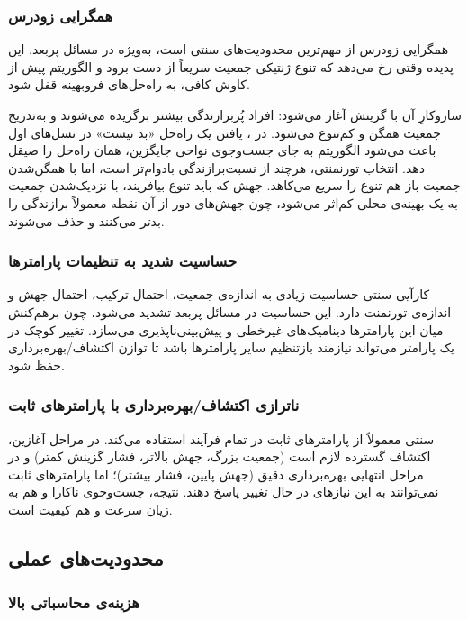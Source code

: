 \subsubsection{همگرايی زودرس}

همگرايی زودرس از مهم‌ترين محدوديت‌های  سنتی است، به‌ويژه در مسائل پربعد. اين پديده وقتی رخ می‌دهد که تنوع ژنتيکی جمعيت سريعاً از دست برود و الگوريتم پيش از کاوش کافی، به راه‌حل‌های فروبهينه قفل شود.

سازوکارِ آن با گزينش آغاز می‌شود: افراد پُربرازندگی بيشتر برگزيده می‌شوند و به‌تدريج جمعيت همگن و کم‌تنوع می‌شود. در ، يافتن يک راه‌حل «بد نيست» در نسل‌های اول باعث می‌شود الگوريتم به جای جست‌وجوی نواحی جايگزين، همان راه‌حل را صيقل دهد. انتخاب تورنمنتی، هرچند از نسبت‌برازندگی بادوام‌تر است، اما با همگن‌شدن جمعيت باز هم تنوع را سريع می‌کاهد. جهش که بايد تنوع بيافريند، با نزديک‌شدن جمعيت به يک بهينه‌ی محلی کم‌اثر می‌شود، چون جهش‌های دور از آن نقطه معمولاً برازندگی را بدتر می‌کنند و حذف می‌شوند.

\subsubsection{حساسيت شديد به تنظيمات پارامترها}

کارآيی  سنتی حساسيت زيادی به اندازه‌ی جمعيت، احتمال ترکيب، احتمال جهش و اندازه‌ی تورنمنت دارد. اين حساسيت در مسائل پربعد تشديد می‌شود، چون برهم‌کنش ميان اين پارامترها ديناميک‌های غيرخطی و پيش‌بينی‌ناپذيری می‌سازد. تغيير کوچک در يک پارامتر می‌تواند نيازمند بازتنظيم ساير پارامترها باشد تا توازن اکتشاف/بهره‌برداری حفظ شود.

\subsubsection{ناترازی اکتشاف/بهره‌برداری با پارامترهای ثابت}

 سنتی معمولاً از پارامترهای ثابت در تمام فرآيند استفاده می‌کند. در مراحل آغازين، اکتشاف گسترده لازم است (جمعيت بزرگ، جهش بالاتر، فشار گزينش کمتر) و در مراحل انتهايی بهره‌برداری دقيق (جهش پايين، فشار بيشتر)؛ اما پارامترهای ثابت نمی‌توانند به اين نيازهای در حال تغيير پاسخ دهند. نتيجه، جست‌وجوی ناکارا و هم به زيان سرعت و هم کيفيت است.

\subsection{محدوديت‌های عملی}

\subsubsection{هزينه‌ی محاسباتی بالا}

